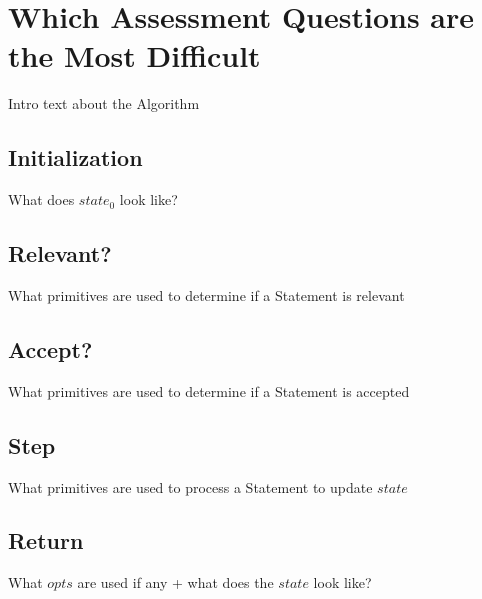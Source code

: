 \documentclass[../main.tex]{subfiles}
\begin{document}
\section{Which Assessment Questions are the Most Difficult}
Intro text about the Algorithm
\subsection{Initialization}
What does $state_{0}$ look like?
\subsection{Relevant?}
What primitives are used to determine if a Statement is relevant
\subsection{Accept?}
What primitives are used to determine if a Statement is accepted
\subsection{Step}
What primitives are used to process a Statement to update $state$
\subsection{Return}
What $opts$ are used if any + what does the $state$ look like?
\end{document}
